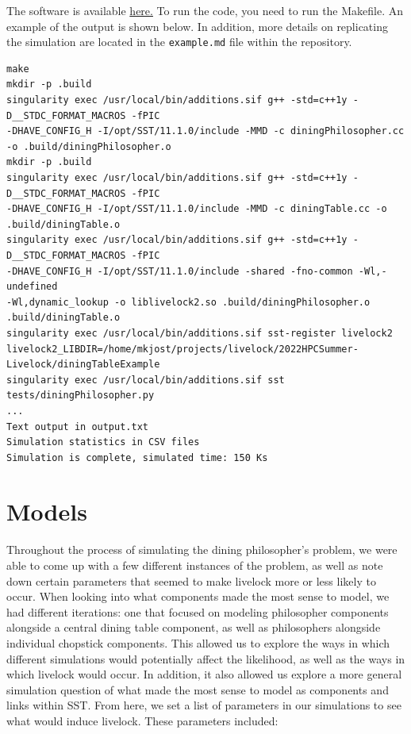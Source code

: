 \documentclass{article}
\begin{document}
The software is available \href{https://github.com/lpsmodsim/2022HPCSummer-Livelock}{here.}  To run the code, you need to run the Makefile.  An example of the output is shown below. In addition, more details on replicating the simulation are located in the \texttt{example.md} file within the repository.
 \begin{verbatim}
make
mkdir -p .build
singularity exec /usr/local/bin/additions.sif g++ -std=c++1y -D__STDC_FORMAT_MACROS -fPIC 
-DHAVE_CONFIG_H -I/opt/SST/11.1.0/include -MMD -c diningPhilosopher.cc 
-o .build/diningPhilosopher.o
mkdir -p .build
singularity exec /usr/local/bin/additions.sif g++ -std=c++1y -D__STDC_FORMAT_MACROS -fPIC 
-DHAVE_CONFIG_H -I/opt/SST/11.1.0/include -MMD -c diningTable.cc -o .build/diningTable.o
singularity exec /usr/local/bin/additions.sif g++ -std=c++1y -D__STDC_FORMAT_MACROS -fPIC 
-DHAVE_CONFIG_H -I/opt/SST/11.1.0/include -shared -fno-common -Wl,-undefined 
-Wl,dynamic_lookup -o liblivelock2.so .build/diningPhilosopher.o .build/diningTable.o
singularity exec /usr/local/bin/additions.sif sst-register livelock2 
livelock2_LIBDIR=/home/mkjost/projects/livelock/2022HPCSummer-Livelock/diningTableExample
singularity exec /usr/local/bin/additions.sif sst tests/diningPhilosopher.py 
...
Text output in output.txt
Simulation statistics in CSV files
Simulation is complete, simulated time: 150 Ks
 \end{verbatim}

\section{Models} %
Throughout the process of simulating the dining philosopher's problem, we were able to come up with a few different instances of the 
problem, as well as note down certain parameters that seemed to make livelock more or less likely to occur.  When looking into what components 
made the most sense to model, we had different iterations: one that focused on modeling philosopher components alongside a central dining table 
component, as well as philosophers alongside individual chopstick components.  This allowed us to explore the ways in which different simulations 
would potentially affect the likelihood, as well as the ways in which livelock would occur.  In addition, it also allowed us explore a more general simulation question of what made the most sense to model as components and links within SST.  From here, we set a list of parameters in our 
simulations to see what would induce livelock.  These parameters included:
\end{document}
